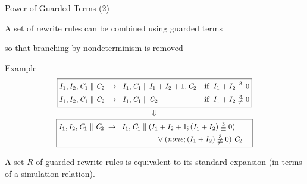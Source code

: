 \documentclass[11pt]{beamer}
\begin{document}
\begin{frame}{Power of Guarded Terms (2)}
\begin{outeritemize}
    \item A set of rewrite rules can be combined using guarded terms
    
    \begin{inneritemize}
        \item so that \alert{branching by nondeterminism is removed}
    \end{inneritemize}
    
    \pause
    \item Example
    \[
    \scalebox{0.9}{\ensuremath{
    \begin{gathered}
    \boxed{
    \begin{aligned}
    I_1, I_2, \mathit{C}_1 \parallel \mathit{C}_2 &\;\rews \;\;I_1,\mathit{C}_1 \parallel I_1 + I_2 + 1, \mathit{C}_2  && \textbf{if} \;\;   I_1 + I_2 \;\raisebox{-0.5ex}{\ensuremath{\stackrel{3}{\equiv}}}\; 0 \\
    I_1,I_2,\mathit{C}_1 \parallel \mathit{C}_2 &\;\rews\;\;I_1,\mathit{C}_1 \parallel \mathit{C}_2 \quad && \textbf{if} \;\;  I_1 + I_2 \;\raisebox{-0.5ex}{\ensuremath{\not\stackrel{3}{\equiv}}}\; 0 
    \end{aligned}
    }
    \\[-0.5ex]
    \Downarrow
    \\[-0.5ex]
    \boxed{
    \begin{aligned}
    I_1, I_2, \mathit{C}_1 \parallel \mathit{C}_2 &\;\rews \;\;I_1, \mathit{C}_1 \parallel \begin{multlined}[t](I_1 + I_2 + 1; (I_1 + I_2) \;\raisebox{-0.5ex}{\ensuremath{\stackrel{3}{\equiv}}}\; 0)\\ \vee (\mathit{none}; (I_1 + I_2) \;\raisebox{-0.5ex}{\ensuremath{\not\stackrel{3}{\equiv}}}\; 0)\;\mathit{C}_2\end{multlined} 
    \end{aligned}
    }
    \end{gathered}
    }}
    \]
\end{outeritemize}

\pause
\begin{theorem}\small
\label{thm:sim}
A set $R$ of guarded rewrite rules is equivalent to its \alert{standard expansion}
(in terms of a simulation relation).
\end{theorem}
\end{frame}
\end{document}
